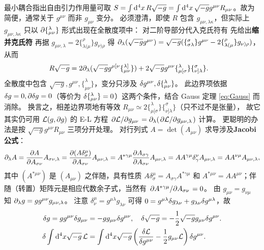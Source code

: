 最小耦合指出自由引力作用量可取 $S=\int\dd[4]{x}R\sqrt{-g}=\int\dd[4]{x}\sqrt{-g}g^{\mu\nu} R_{\mu\nu}$。故为简便，通常关于 $g^{\mu\nu}$ 而非 $g_{\mu\nu}$ 变分。
必须澄清，即使 $R$ 包含 $g_{\mu\nu,\lambda\kappa}$，但实际上 $g_{\mu\nu,\lambda\kappa}$ 只以 $\partial\{^\lambda_{\mu\nu}\}$ 形式出现在全散度项中：
对二阶导部分代入克氏符有
先给出\textbf{缩并克氏符}
再据 $g_{\mu\nu,\lambda}=2\{^\rho_{\lambda(\mu}\}g_{\nu)\rho}$ 得 $\partial_\lambda(\sqrt{-g}g^{\mu\nu}) = \sqrt{-g}(\{_{ \sigma\lambda}^\sigma\}g^{\mu\nu}-2\{^\rho_{\lambda(\mu}\}g_{\nu)\rho})$，
从而
\begin{align*}
    R\sqrt{-g}
&=2\partial_\lambda (\sqrt{-g} g^{\mu [\nu} \{_{\mu \nu}^{\lambda]}\} )+2\sqrt{-g}g^{\mu\nu} \{^\lambda_{\mu[\sigma}\}\{^\sigma_{\nu]\lambda}\}.
\end{align*}
全散度中包含 $\sqrt{-g},g^{\mu\nu},\{^\lambda_{\mu\nu}\}$，变分只涉及 $\var g^{\mu\nu},\var\{_{\mu\nu}^\lambda\}$。
此边界项依据 $\var g=0,\partial\var g=0$（等价为 $\var\{_{\mu\nu}^\lambda\}=0$）这两个条件，结合 Gauss 定理 \eqref{eq:Gauss} 而消除。
换言之，相差边界项地有等效 $R_{\mu\nu} \simeq 2 \{^\lambda_{\mu[\sigma}\}\{^\sigma_{\nu]\lambda}\}$（只不过不是张量），
故它其实仍可用 $\mathcal{L}(g,\partial g)$ 的 E-L 方程 $\pdv*{\mathcal{L}}{g_{\mu\nu}}=\partial_\lambda(\pdv*{\mathcal{L}}{g_{\mu\nu,\lambda}})$ 计算。
更聪明的办法是按 $\sqrt{-g}g^{\mu\nu} R_{\mu\nu}$ 三项分开处理。
对行列式 $A=\det(A_{\mu\nu})$ 求导涉及\textbf{Jacobi 公式}：
\[\partial_\lambda A=\pdv{A}{A_{\sigma\nu}}A_{\sigma \nu,\lambda}=\pdv{(A\delta_\sigma^\mu)}{A_{\sigma\nu}}A_{\mu \nu,\lambda} =A^{*\gamma\mu}\pdv{A_{\sigma\gamma}}{A_{\sigma\nu}} A_{\mu \nu,\lambda}=AA^{\gamma\mu}\delta^\nu_\gamma A_{\mu \nu,\lambda}=AA^{\nu\mu} A_{\mu \nu,\lambda},\]
其中 $(A^{*\mu\nu})$ 是 $(A_{\mu\nu})$ 之伴随，具有性质 $A\delta_\sigma^\mu=A_{\sigma\gamma}A^{*\gamma\mu}$ 和 $A^{*\mu\nu}=AA^{\mu\nu}$；伴随（转置）矩阵元是相应代数余子式，当然有 $\pdv*{A^{*\gamma\mu}}{A_{\sigma\nu}}=0$。
由 $g_{\mu\nu}=g_{\nu\mu}$ 知 $\partial_\lambda g=g g^{\mu \nu} g_{\mu \nu,\lambda}$。
注意 $\delta^{\mu}_{\nu}=g^{\mu\lambda}g_{\lambda\nu}$ 可得 $0=g^{\mu\lambda}\var g_{\lambda\nu}+g_{\lambda\nu}\var g^{\mu\lambda}$，故
\begin{align*}
    \var g=gg^{\mu\nu}\var g_{\mu\nu}&=-g g_{\mu\nu}\var g^{\mu\nu},\quad \delta \sqrt{-g}=-\frac12\sqrt{-g}g_{\mu\nu}\var g^{\mu\nu}.\\
    \var\int\d[4]x\sqrt{-g}\,\Lag &= \int\d[4]x\sqrt{-g}\left(\fdv{\Lag}{g^{\mu\nu}} - \frac12 g_{\mu\nu}\Lag\right)\var g^{\mu\nu}.
\end{align*}
